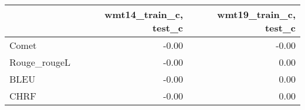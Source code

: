 \begin{tabular}{lrr}
\toprule
 & wmt14\_train\_c, test\_c & wmt19\_train\_c, test\_c \\
\midrule
Comet & -0.00 & -0.00 \\
Rouge\_rougeL & -0.00 & 0.00 \\
BLEU & -0.00 & 0.00 \\
CHRF & -0.00 & 0.00 \\
\bottomrule
\end{tabular}
